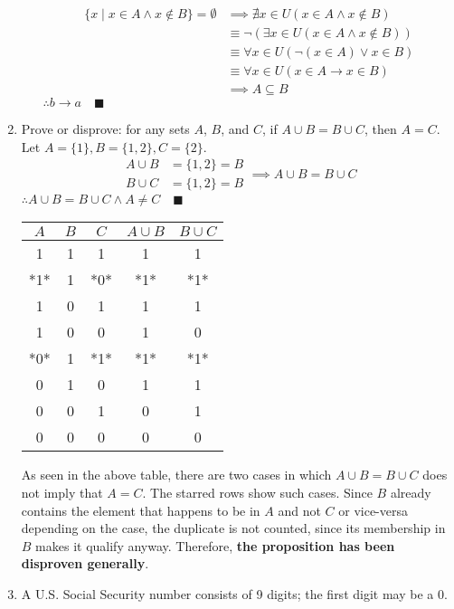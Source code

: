 \documentclass[letterpaper, 12pt]{article}
\newcommand{\qed}{\quad \blacksquare}
\newcommand{\then}{\rightarrow}
\newcommand{\0}{\emptyset}
\begin{document}
\begin{enumerate}
\begin{enumerate}[i.]
    \begin{align*}
        \{x \mid x \in A \wedge x \notin B\} = \0 
        &\implies \nexists x \in U(x \in A \wedge x \notin B) \\
        &\equiv \neg(\exists x \in U (x \in A \wedge x \notin B)) \\
        &\equiv \forall x \in U (\neg(x \in A) \vee x \in B) \\
        &\equiv \forall x \in U (x \in A \then x \in B) \\
        &\implies A \subseteq B
    \end{align*}
    $\therefore b \then a \qed$
\end{enumerate}
\item Prove or disprove: for any sets $A$, $B$, and $C$, if $A \cup B = B \cup C$, then $A = C$.
Let $A = \{1\}, B = \{1, 2\}, C = \{2\}$.
\[
\begin{aligned}
    A \cup B &= \{1, 2\} = B \\
    B \cup C &= \{1, 2\} = B
\end{aligned}
\implies A \cup B = B \cup C
\]
$\therefore A \cup B = B \cup C \wedge A \ne C \qed$
\begin{center}
\begin{tabular}{c | c | c | c | c}
    $A$ & $B$ & $C$ & $A \cup B$ & $B \cup C$ \\
    \hline
    1 & 1 & 1 & 1 & 1 \\
    *1* & 1 & *0* & *1* & *1* \\
    1 & 0 & 1 & 1 & 1 \\
    1 & 0 & 0 & 1 & 0 \\
    *0* & 1 & *1* & *1* & *1* \\
    0 & 1 & 0 & 1 & 1 \\
    0 & 0 & 1 & 0 & 1 \\
    0 & 0 & 0 & 0 & 0 \\
\end{tabular}
\end{center}
\begin{flushleft}
    As seen in the above table, there are two cases in which $A \cup B = B \cup C$ does not 
    imply that $A = C$. The starred rows show such cases. Since $B$ already contains the 
    element that happens to be in $A$ and not $C$ or vice-versa depending on the case, the 
    duplicate is not counted, since its membership in $B$ makes it qualify anyway. Therefore, 
    \textbf{the proposition has been disproven generally}.
\end{flushleft}
\item A U.S. Social Security number consists of 9 digits; the first digit may be a 0.

\end{enumerate}
\end{document}

